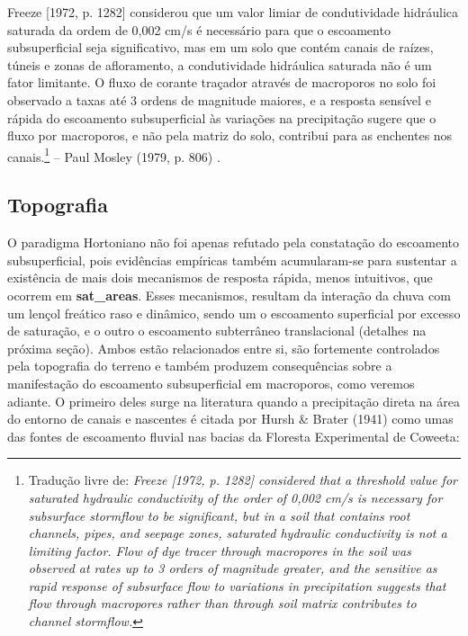 \documentclass[./main.tex]{subfiles}
\begin{document}
\begin{adjustwidth}{100pt}{0pt}
\medskip
\small Freeze [1972, p. 1282] considerou que um valor limiar de condutividade hidráulica saturada da ordem de 0,002 cm/s é necessário para que o escoamento subsuperficial seja significativo, mas em um solo que contém canais de raízes, túneis e zonas de afloramento, a condutividade hidráulica saturada não é um fator limitante. O fluxo de corante traçador através de macroporos no solo foi observado a taxas até 3 ordens de magnitude maiores, e a resposta sensível e rápida do escoamento subsuperficial às variações na precipitação sugere que o fluxo por macroporos, e não pela matriz do solo, contribui para as enchentes nos canais.\footnote{Tradução livre de: \textit{Freeze [1972, p. 1282] considered that a threshold value for saturated hydraulic conductivity of the order of 0,002 cm/s is necessary for subsurface stormflow to be significant, but in a soil that contains root channels, pipes, and seepage zones, saturated hydraulic conductivity is not a limiting factor. Flow of dye tracer through macropores in the soil was observed at rates up to 3 orders of magnitude greater, and the sensitive as rapid response of subsurface flow to variations in precipitation suggests that flow through macropores rather than through soil matrix contributes to channel stormflow.}} -- Paul Mosley (1979, p. 806) \cite{Mosley1979}.
\medskip
\end{adjustwidth}

\subsection{Topografia}


\par O \gls{paradigma} Hortoniano não foi apenas refutado pela constatação do escoamento subsuperficial, pois evidências empíricas também acumularam-se para sustentar a existência de mais dois mecanismos de resposta rápida, menos intuitivos, que ocorrem em \textbf{\gls{sat_areas}}. Esses mecanismos, resultam da interação da chuva com um lençol freático raso e dinâmico, sendo um o escoamento superficial por excesso de saturação, e o outro o escoamento subterrâneo translacional (detalhes na próxima seção). Ambos estão relacionados entre si, são fortemente controlados pela topografia do terreno e também produzem consequências sobre a manifestação do escoamento subsuperficial em macroporos, como veremos adiante. O primeiro deles surge na literatura quando a precipitação direta na área do entorno de canais e nascentes é citada por Hursh \& Brater (1941) \cite{Hursh1941} como umas das fontes de escoamento fluvial nas bacias da Floresta Experimental de Coweeta:   
\end{document}
